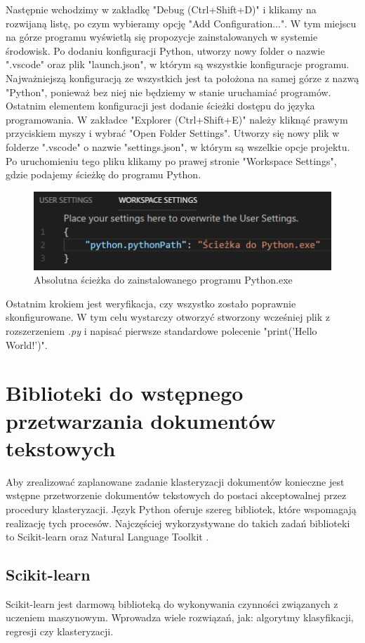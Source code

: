 Następnie wchodzimy w zakładkę "Debug (Ctrl+Shift+D)" i klikamy na rozwijaną listę, po czym wybieramy opcję "Add Configuration...". W tym miejscu na górze programu wyświetlą się propozycje zainstalowanych w systemie środowisk. Po dodaniu konfiguracji Python, utworzy nowy folder o nazwie ".vscode" oraz plik "launch.json", w którym są wszystkie konfiguracje programu. Najważniejszą konfiguracją ze wszystkich jest ta położona na samej górze z nazwą "Python", ponieważ bez niej nie będziemy w stanie uruchamiać programów. Ostatnim elementem konfiguracji jest dodanie ścieżki dostępu do języka programowania. W zakładce "Explorer (Ctrl+Shift+E)" należy kliknąć prawym przyciskiem myszy i wybrać "Open Folder Settings". Utworzy się nowy plik w folderze ".vscode" o nazwie "settings.json", w którym są wszelkie opcje projektu. Po uruchomieniu tego pliku klikamy po prawej stronie "Workspace Settings", gdzie podajemy ścieżkę do programu Python.

\begin{figure}[h!]
    \centering
    \includegraphics{Rysunki/Rozdzial2/3.png}
    \caption{Absolutna ścieżka do zainstalowanego programu Python.exe}
    \label{fig:pythonPath}
\end{figure}

Ostatnim krokiem jest weryfikacja, czy wszystko zostało poprawnie skonfigurowane. W tym celu wystarczy otworzyć stworzony wcześniej plik z rozszerzeniem \textit{.py} i napisać pierwsze standardowe polecenie "print('Hello World!')".

\newpage
\section{Biblioteki do wstępnego przetwarzania dokumentów tekstowych}
Aby zrealizować zaplanowane zadanie klasteryzacji dokumentów konieczne jest wstępne przetworzenie dokumentów tekstowych do postaci akceptowalnej przez procedury klasteryzacji. Język Python oferuje szereg bibliotek, które wspomagają realizację tych procesów. Najczęściej wykorzystywane do takich zadań biblioteki to Scikit-learn \cite{scikit-learn} oraz Natural Language Toolkit \cite{Loper02nltk:the}.

\subsection{Scikit-learn}
Scikit-learn jest darmową biblioteką do wykonywania czynności związanych z uczeniem maszynowym. Wprowadza wiele rozwiązań, jak: algorytmy klasyfikacji, regresji czy klasteryzacji. 


